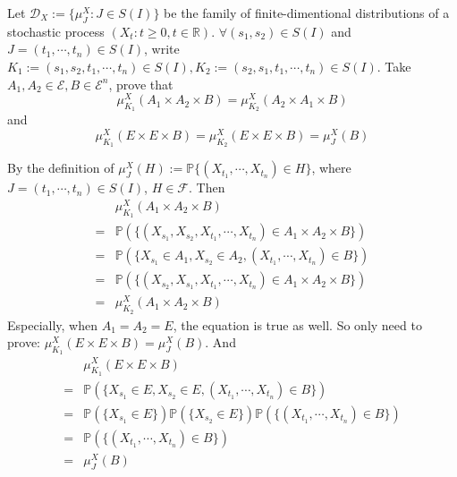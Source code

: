 \documentclass{ctexart}
\begin{document}
\begin{problem}\label{pro:3}
	Let \(\mathscr{D}_X:=\{\mu_J^X:J \in S(I)\}\) be the family of finite-dimentional distributions of a stochastic process \((X_t:t \geq 0,t \in \mathbb{R})\).
	\(\forall (s_1,s_2)\in S(I)\) and \(J=(t_1,\cdots,t_n)\in S(I)\), write \(K_1:=(s_1,s_2,t_1,\cdots,t_n) \in S(I),K_2:=(s_2,s_1,t_1,\cdots,t_n) \in S(I)\).
	Take \(A_1,A_2 \in \mathscr{E},B \in \mathscr{E}^n\), prove that
	\[
		\mu^X_{K_1}(A_1 \times A_2 \times B)=\mu^X_{K_2}(A_2 \times A_1 \times B)
	\]
	and
	\[
		\mu^X_{K_1}(E \times E \times B)=\mu^X_{K_2}(E \times E \times B)=\mu^X_{J}(B)
	\]
\end{problem}
\begin{solution}
	By the definition of \(\mu^X_{J}(H):=\mathbb{P}\{(X_{t_1},\cdots,X_{t_n}) \in H\}\),
	where \(J = (t_1,\cdots,t_n) \in S(I)\), \(H \in \mathscr{F}\).
	Then
	\begin{equation}
		\begin{aligned}
			  & \mu^X_{K_1}(A_1 \times A_2 \times B)                                                 \\
			= & \mathbb{P}(\{(X_{s_1},X_{s_2},X_{t_1},\cdots,X_{t_n}) \in A_1 \times A_2 \times B\}) \\
			= & \mathbb{P}(\{X_{s_1} \in A_1, X_{s_2} \in A_2, (X_{t_1},\cdots,X_{t_n}) \in B \})    \\
			= & \mathbb{P}(\{(X_{s_2},X_{s_1},X_{t_1},\cdots,X_{t_n}) \in A_1 \times A_2 \times B\}) \\
			= & \mu^X_{K_2}(A_1 \times A_2 \times B)
		\end{aligned}
	\end{equation}
	Especially, when \(A_1=A_2=E\), the equation is true as well.
	So only need to prove: \(\mu^X_{K_1}(E \times E \times B) = \mu^X_J(B)\).
	And
	\begin{equation}
		\begin{aligned}
			  & \mu^X_{K_1}(E \times E \times B)                                                                          \\
			= & \mathbb{P}(\{X_{s_1} \in E, X_{s_2} \in E, (X_{t_1},\cdots,X_{t_n}) \in B \})                             \\
			= & \mathbb{P}(\{X_{s_1} \in E\})\mathbb{P}(\{X_{s_2} \in E\})\mathbb{P}(\{(X_{t_1},\cdots,X_{t_n}) \in B \}) \\
			= & \mathbb{P}(\{(X_{t_1},\cdots,X_{t_n}) \in B\})                                                            \\
			= & \mu^X_J(B)
		\end{aligned}
	\end{equation}
\end{solution}
\end{document}

